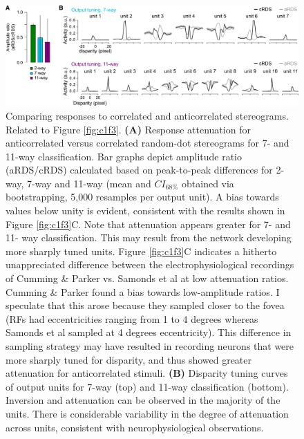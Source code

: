 {\begin{figure}[!h]
  \centering
  \includegraphics[width=14cm,keepaspectratio]{FigS3.png}
  \caption[Responses to correlated and anticorrelated stereograms.]{Comparing responses to correlated and anticorrelated stereograms. Related to Figure \ref{fig:c1f3}. \textbf{(A)} Response attenuation for anticorrelated versus correlated random-dot stereograms for 7- and 11-way classification. Bar graphs depict amplitude ratio (aRDS/cRDS) calculated based on peak-to-peak differences for 2-way, 7-way and 11-way (mean and $CI_{68\%}$ obtained via bootstrapping, 5,000 resamples per output unit). A bias towards values below unity is evident, consistent with the results shown in Figure \ref{fig:c1f3}C. Note that attenuation appears greater for 7- and 11- way classification. This may result from the network developing more sharply tuned units. Figure \ref{fig:c1f3}C indicates a hitherto unappreciated difference between the electrophysiological recordings of Cumming \& Parker \cite{Cumming:1997ve} vs. Samonds et al \cite{Samonds:2013cs} at low attenuation ratios. Cumming \& Parker \cite{Cumming:1997ve} found a bias towards low-amplitude ratios. I speculate that this arose because they sampled closer to the fovea (RFs had eccentricities ranging from 1 to 4 degrees whereas Samonds et al sampled at 4 degrees eccentricity). This difference in sampling strategy may have resulted in recording neurons that were more sharply tuned for disparity, and thus showed greater attenuation for anticorrelated stimuli. \textbf{(B)} Disparity tuning curves of output units for 7-way (top) and 11-way classification (bottom). Inversion and attenuation can be observed in the majority of the units. There is considerable variability in the degree of attenuation across units, consistent with neurophysiological observations.}
  \label{fig:c1fs3}
\end{figure}


}
